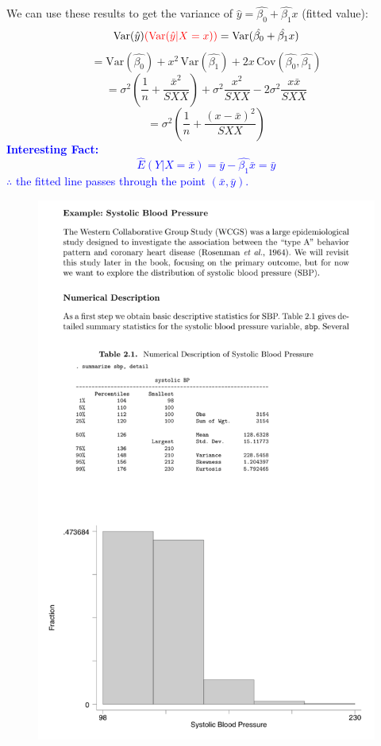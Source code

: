 \documentclass[14pt]{extarticle}
\begin{document}
We can use these results to get the variance of $\hat{y} = \hat{\beta_0} + \hat{\beta_1} x$ (fitted value):
\[
\text{Var}(\hat{y})\textcolor{red}{ (\text{Var}(\hat{y}|X=x)) }= \text{Var}(\hat{\beta_0} + \hat{\beta_1} x)
\]
\[
= \text{Var}(\hat{\beta_0}) + x^2 \, \text{Var}(\hat{\beta_1}) + 2x \, \text{Cov}(\hat{\beta_0}, \hat{\beta_1})
\]
\[
= \sigma^2 \left( \frac{1}{n} + \frac{\bar{x}^2}{SXX} \right) + \sigma^2 \frac{x^2}{SXX} - 2 \sigma^2 \frac{x \bar{x}}{SXX}
\]
\[
= \sigma^2 \left( \frac{1}{n} + \frac{(x - \bar{x})^2}{SXX} \right)
\]
\textcolor{blue}{\textbf{Interesting Fact:}
\[
\hat{E}(Y | X = \bar{x}) = \bar{y} - \hat{\beta_1} \bar{x} = \bar{y}
\]
$\therefore$ the fitted line passes through the point $(\bar{x}, \bar{y})$.
}
\begin{figure}[H]
    \centering
    \includegraphics[height=0.65\textheight, angle=270]{fig4.png}
\end{figure}
\end{document}
